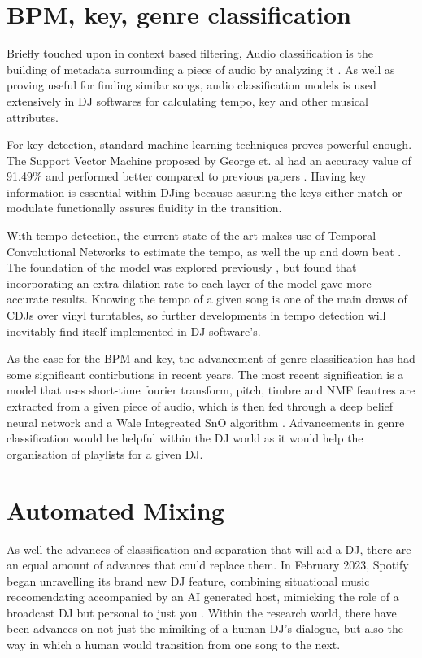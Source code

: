 \section{BPM, key, genre classification}
Briefly touched upon in context based filtering, Audio classification is the building of metadata surrounding a piece of audio by analyzing it \citep{sharma_audio_2021}. As well as proving useful for finding similar songs, audio classification models is used extensively in DJ softwares for calculating tempo, key and other musical attributes.

For key detection, standard machine learning techniques proves powerful enough. The Support Vector Machine proposed by George et. al had an accuracy value of 91.49\% and performed better compared to previous papers \citep{george_development_2022}. Having key information is essential within DJing because assuring the keys either match or modulate functionally assures fluidity in the transition. 

With tempo detection, the current state of the art makes use of Temporal Convolutional Networks to estimate the tempo, as well the up and down beat \citep{bock_deconstruct_2020}. The foundation of the model was explored previously \citep{bock_multi-task_2019}, but found that incorporating an extra dilation rate to each layer of the model gave more accurate results. Knowing the tempo of a given song is one of the main draws of CDJs over vinyl turntables, so further developments in tempo detection will inevitably find itself implemented in DJ software's.

As the case for the BPM and key, the advancement of genre classification has had some significant contirbutions in recent years. The most recent signification is a model that uses short-time fourier transform, pitch, timbre and NMF feautres are extracted from a given piece of audio, which is then fed through a deep belief neural network and a Wale Integreated SnO algorithm \citep{kumaraswamy_optimal_2022}. Advancements in genre classification would be helpful within the DJ world as it would help the organisation of playlists for a given DJ.

\section{Automated Mixing}
As well the advances of classification and separation that will aid a DJ, there are an equal amount of advances that could replace them. In February 2023, Spotify began unravelling its brand new DJ feature, combining situational music reccomendating accompanied by an AI generated host, mimicking the role of a broadcast DJ but personal to just you \citep{naomi_spotify_2023}. Within the research world, there have been advances on not just the mimiking of a human DJ's dialogue, but also the way in which a human would transition from one song to the next.

